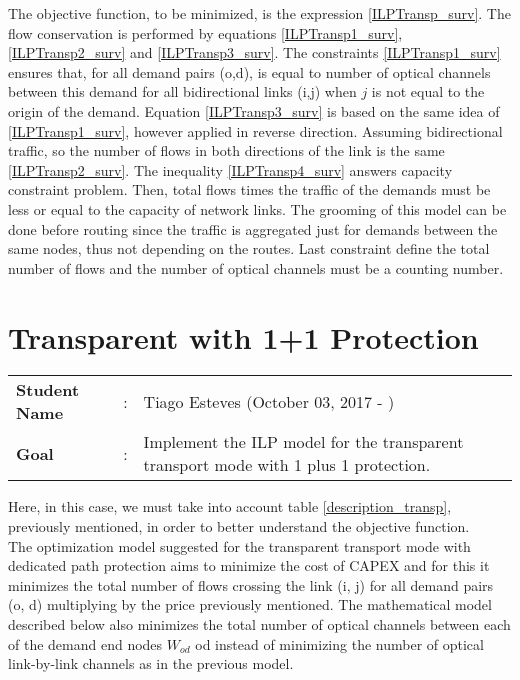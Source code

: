 \vspace{10pt}

The objective function, to be minimized, is the expression \ref{ILPTransp_surv}. The flow conservation is performed by equations \ref{ILPTransp1_surv}, \ref{ILPTransp2_surv} and \ref{ILPTransp3_surv}. The constraints \ref{ILPTransp1_surv} ensures that, for all demand pairs (o,d), is equal to number of optical channels between this demand for all bidirectional links (i,j) when $j$ is not equal to the origin of the demand. Equation \ref{ILPTransp3_surv} is based on the same idea of \ref{ILPTransp1_surv}, however applied in reverse direction. Assuming bidirectional traffic, so the number of flows in both directions of the link is the same \ref{ILPTransp2_surv}. The inequality \ref{ILPTransp4_surv} answers capacity constraint problem. Then, total flows times the traffic of the demands must be less or equal to the capacity of network links. The grooming of this model can be done before routing since the traffic is aggregated just for demands between the same nodes, thus not depending on the routes. Last constraint define the total number of flows and the number of optical channels must be a counting number.\\


\newpage
\section{Transparent with 1+1 Protection}\label{ILP_Transp_Protection}
\begin{tcolorbox}	
\begin{tabular}{p{2.75cm} p{0.2cm} p{10.5cm}} 	
\textbf{Student Name}  &:& Tiago Esteves    (October 03, 2017 - )\\
\textbf{Goal}          &:& Implement the ILP model for the transparent transport mode with 1 plus 1 protection.
\end{tabular}
\end{tcolorbox}
\vspace{11pt}

Here, in this case, we must take into account table \ref{description_transp}, previously mentioned, in order to better understand the objective function.\\

The optimization model suggested for the transparent transport mode with dedicated path protection aims to minimize the cost of CAPEX and for this it minimizes the total number of flows crossing the link (i, j) for all demand pairs (o, d) multiplying by the price previously mentioned. The mathematical model described below also minimizes the total number of optical channels between each of the demand end nodes $W_{od}$ od instead of minimizing the number of optical link-by-link channels as in the previous model.\\

